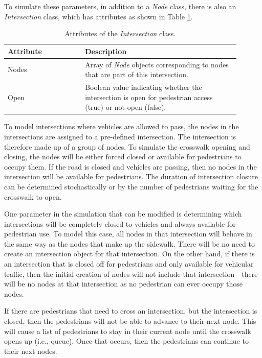 \documentclass[12pt]{article}
\begin{document}
To simulate these parameters, in addition to a \textit{Node} class, there is
also an \textit{Intersection} class, which has attributes as shown in Table
\ref{table:intersection}.

\def\arraystretch{1.5}
\begin{table}[hb!]
  \centering
    \begin{tabular}{p{0.3\linewidth}p{0.6\linewidth}}
     \hline
     Attribute & Description \\
     \hline
     Nodes & Array of \textit{Node} objects corresponding to nodes
             that are part of this intersection. \\
     Open  & Boolean value indicating whether the intersection is open
             for pedestrian access (true) or not open (false). \\
     \hline
    \end{tabular}
    \caption{Attributes of the \textit{Intersection} class.}
  \label{table:intersection}
\end{table}

To model intersections where vehicles are allowed to pass, the nodes in the
intersections are assigned to a pre-defined intersection. The intersection
is therefore made up of a group of nodes. To simulate the crosswalk opening and
closing, the nodes will be either forced closed or available for pedestrians to
occupy them. If the road is closed and vehicles are passing, then no nodes in
the intersection will be available for pedestrians. The duration of
intersection closure can be determined stochastically or by the number of
pedestrians waiting for the crosswalk to open.

One parameter in the simulation that can be modified is determining which
intersections will be completely closed to vehicles and always available for
pedestrian use. To model this case, all nodes in that intersection will behave
in the same way as the nodes that make up the sidewalk. There will be no need to
create an intersection object for that intersection. On the other hand, if there
is an intersection that is closed off for pedestrians and only available for
vehicular traffic, then the initial creation of nodes will not include that
intersection - there will be no nodes at that intersection as no pedestrian can
ever occupy those nodes.

If there are pedestrians that need to cross an intersection, but the
intersection is closed, then the pedestrians will not be able to advance to
their next node. This will cause a list of pedestrians to stay in their
current node until the crosswalk opens up (i.e., queue). Once that occurs, then
the pedestrians can continue to their next nodes.
\end{document}
